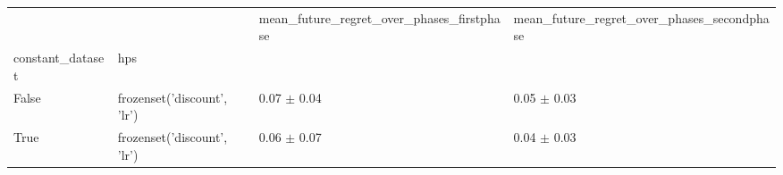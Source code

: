 \begin{tabular}{llll}
\toprule
 &  & mean_future_regret_over_phases_firstphase & mean_future_regret_over_phases_secondphase \\
constant_dataset & hps &  &  \\
\midrule
False & frozenset({'discount', 'lr'}) & 0.07 $\pm$ 0.04 & 0.05 $\pm$ 0.03 \\
\cline{1-4}
True & frozenset({'discount', 'lr'}) & 0.06 $\pm$ 0.07 & 0.04 $\pm$ 0.03 \\
\cline{1-4}
\bottomrule
\end{tabular}
